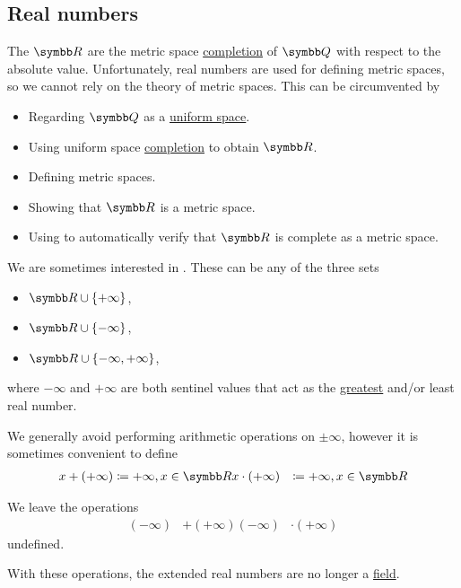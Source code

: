 \subsection{Real numbers}\label{subsec:real_numbers}

\begin{definition}\label{def:real_numbers}
  The  \( \BR \) are the metric space \hyperref[def:complete_metric_space]{completion} of \( \BQ \) with respect to the absolute value. Unfortunately, real numbers are used for defining metric spaces, so we cannot rely on the theory of metric spaces. This can be circumvented by
  \begin{itemize}
    \item Regarding \( \BQ \) as a \hyperref[def:uniform_space]{uniform space}.
    \item Using uniform space \hyperref[thm:uniform_space_completion]{completion} to obtain \( \BR \).
    \item Defining metric spaces.
    \item Showing that \( \BR \) is a metric space.
    \item Using  to automatically verify that \( \BR \) is complete as a metric space.
  \end{itemize}
\end{definition}

\begin{definition}\label{def:extended_real_numbers}
  We are sometimes interested in . These can be any of the three sets
  \begin{itemize}
    \item \( \BR \cup \{ +\infty \} \),
    \item \( \BR \cup \{ -\infty \} \),
    \item \( \BR \cup \{ -\infty, +\infty \} \),
  \end{itemize}
  where \( -\infty \) and \( +\infty \) are both sentinel values that act as the \hyperref[def:preordered_set/largest_smallest_element]{greatest} and/or least real number.

  We generally avoid performing arithmetic operations on \( \pm \infty \), however it is sometimes convenient to define
  \begin{align*}
    x + (+\infty) &\coloneqq +\infty, x \in \BR
    x \cdot (+\infty) &\coloneqq +\infty, x \in \BR
  \end{align*}

  We leave the operations
  \begin{align*}
    (-\infty) &+ (+\infty)
    (-\infty) &\cdot (+\infty)
  \end{align*}
  undefined.

  With these operations, the extended real numbers are no longer a \hyperref[def:field]{field}.
\end{definition}

